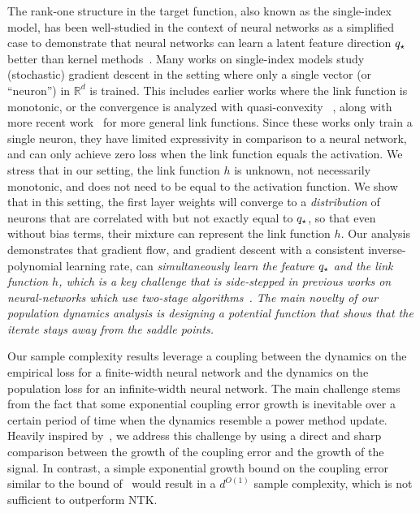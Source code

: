 The rank-one structure in the target function, also known as the single-index model, has been well-studied in the context of neural networks as a simplified case to demonstrate that neural networks can learn a latent feature direction $q_\star$ better than kernel methods~\citep{mousavi2022neural, abbe2022merged, damian2022neural, bietti2022learning}. 
Many works on single-index models study (stochastic) gradient descent in the setting where only a single vector (or ``neuron'') in $\mathbb{R}^d$ is trained. This includes earlier works where the link function is monotonic, or the convergence is analyzed with quasi-convexity ~\citep{kakade2011efficient,hazan2015beyond,mei2018landscape,soltanolkotabi2017learning}, along with more recent work~\citep{tan2019online, vardi2021learning, arous2021online} for more general link functions. Since these works only train a single neuron, they have limited expressivity in comparison to a neural network, and can only achieve zero loss when the link function equals the activation. We stress that in our setting, the link function $h$ is unknown, not necessarily monotonic, and does not need to be equal to the activation function. We show that in this setting, the first layer weights will converge to a \textit{distribution} of neurons that are correlated with but not exactly equal to $q_\star$, so that even without bias terms, their mixture can represent the link function $h$. Our analysis demonstrates that gradient flow, and gradient descent with a consistent inverse-polynomial learning rate, can \em simultaneously \em learn the feature $q_\star$ and the link function $h$, which is a key challenge that is side-stepped in previous works on neural-networks which use two-stage algorithms~\citep{mousavi2022neural, abbe2021staircase, abbe2022merged, damian2022neural, barak2022hidden}. The main novelty of our population dynamics analysis is designing a potential function that shows that the iterate stays away from the saddle points.

Our sample complexity results leverage a coupling between the dynamics on the empirical loss for a finite-width neural network and the dynamics on the population loss for an infinite-width neural network. The main challenge stems from the fact that some exponential coupling error growth is inevitable over a certain period of time when the dynamics resemble a power method update. 
Heavily inspired by~\citet{li2020learning}, we address this challenge by using a direct and sharp comparison between the growth of the coupling error and the growth of the signal.
In contrast, a simple exponential growth bound on the coupling error similar to the bound of~\citet{mei2019generalization} would result in a $d^{O(1)}$ sample complexity, which is not sufficient to outperform NTK.

